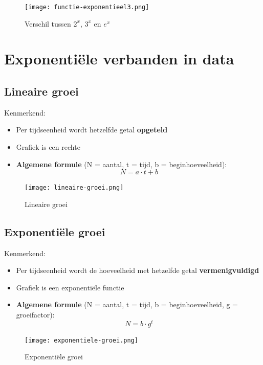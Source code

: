 \documentclass{article}
\begin{document}
\begin{figure}[H]
    \centering
    \texttt{[image: functie-exponentieel3.png]}
    \caption{Verschil tussen $2^x$, $3^x$ en $e^x$}
\end{figure}

\section{Exponentiële verbanden in data}

\subsection{Lineaire groei}

Kenmerkend:

\begin{itemize}
    \item Per tijdseenheid wordt hetzelfde getal \textbf{opgeteld}
    \item Grafiek is een rechte
    \item \textbf{Algemene formule} (N = aantal, t = tijd, b = beginhoeveelheid): 
    \begin{equation}
        N = a\cdot t + b
    \end{equation}
\end{itemize}

\begin{figure}[H]
    \centering
    \texttt{[image: lineaire-groei.png]}
    \caption{Lineaire groei}
\end{figure}

\subsection{Exponentiële groei}

Kenmerkend: 

\begin{itemize}
    \item Per tijdseenheid wordt de hoeveelheid met hetzelfde getal \textbf{vermenigvuldigd}
    \item Grafiek is een exponentiële functie
    \item \textbf{Algemene formule} (N = aantal, t = tijd, b = beginhoeveelheid, g = groeifactor): 
    \begin{equation}
        N = b \cdot g^t
    \end{equation}
\end{itemize}

\begin{figure}[H]
    \centering
    \texttt{[image: exponentiele-groei.png]}
    \caption{Exponentiële groei}
\end{figure}
\end{document}

